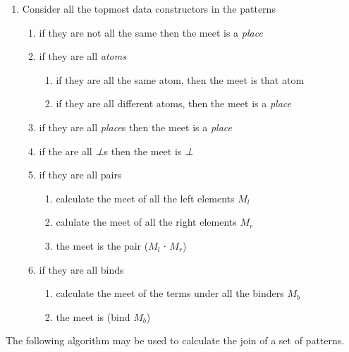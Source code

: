 \begin{appendices}
\begin{enumerate}
\item Consider all the topmost data constructors in the patterns
  \begin{enumerate}
  \item if they are not all the same then the meet is a \emph{place}
  \item if they are all \emph{atoms}
    \begin{enumerate}
    \item if they are all the same atom, then the meet is that atom
      \item if they are all different atoms, then the meet is a \emph{place}
    \end{enumerate}
  \item if they are all \emph{place}s then the meet is a \emph{place}
  \item if the are all \emph{⊥}s then the meet is \emph{⊥}  
  \item if they are all pairs
    \begin{enumerate}
      \item calculate the meet of all the left elements $M_l$
      \item calulate the meet of all the right elements $M_r$
      \item the meet is the pair ($M_l$ ∙ $M_r$)
    \end{enumerate}
  \item if they are all binds
    \begin{enumerate}
    \item calculate the meet of the terms under all the binders $M_b$
    \item the meet is (bind $M_b$)
    \end{enumerate}
  \end{enumerate}
\end{enumerate}

The following algorithm may be used to calculate the join of a set
of patterns.


\end{appendices}
